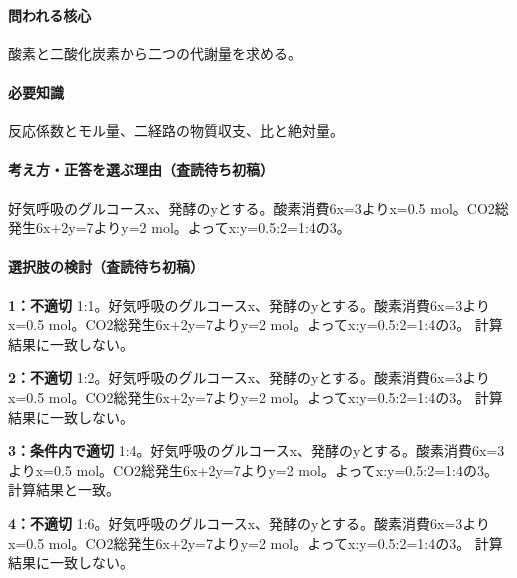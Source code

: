 \paragraph{問われる核心} 酸素と二酸化炭素から二つの代謝量を求める。

\paragraph{必要知識} 反応係数とモル量、二経路の物質収支、比と絶対量。

\paragraph{考え方・正答を選ぶ理由（査読待ち初稿）} 好気呼吸のグルコースx、発酵のyとする。酸素消費6x=\allowbreak{}3よりx=\allowbreak{}0.5 mol。CO2総発生6x+2y=\allowbreak{}7よりy=\allowbreak{}2 mol。よってx:y=\allowbreak{}0.5:2=\allowbreak{}1:4の3。

\paragraph{選択肢の検討（査読待ち初稿）}\mbox{}\par

\noindent\textbf{1：不適切} 1:1。好気呼吸のグルコースx、発酵のyとする。酸素消費6x=\allowbreak{}3よりx=\allowbreak{}0.5 mol。CO2総発生6x+2y=\allowbreak{}7よりy=\allowbreak{}2 mol。よってx:y=\allowbreak{}0.5:2=\allowbreak{}1:4の3。 計算結果に一致しない。\par

\noindent\textbf{2：不適切} 1:2。好気呼吸のグルコースx、発酵のyとする。酸素消費6x=\allowbreak{}3よりx=\allowbreak{}0.5 mol。CO2総発生6x+2y=\allowbreak{}7よりy=\allowbreak{}2 mol。よってx:y=\allowbreak{}0.5:2=\allowbreak{}1:4の3。 計算結果に一致しない。\par

\noindent\textbf{3：条件内で適切} 1:4。好気呼吸のグルコースx、発酵のyとする。酸素消費6x=\allowbreak{}3よりx=\allowbreak{}0.5 mol。CO2総発生6x+2y=\allowbreak{}7よりy=\allowbreak{}2 mol。よってx:y=\allowbreak{}0.5:2=\allowbreak{}1:4の3。 計算結果と一致。\par

\noindent\textbf{4：不適切} 1:6。好気呼吸のグルコースx、発酵のyとする。酸素消費6x=\allowbreak{}3よりx=\allowbreak{}0.5 mol。CO2総発生6x+2y=\allowbreak{}7よりy=\allowbreak{}2 mol。よってx:y=\allowbreak{}0.5:2=\allowbreak{}1:4の3。 計算結果に一致しない。\par

